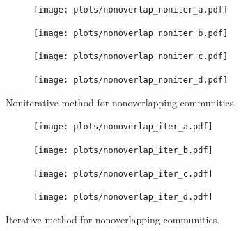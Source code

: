 
\newcommand{\plotwidth}{0.63\linewidth}

\begin{figure}
    \centering
    \begin{subfigure}{0.5\textwidth}
    \centering
    \texttt{[image: plots/nonoverlap\_noniter\_a.pdf]}
    \end{subfigure}%
    \begin{subfigure}{0.5\textwidth}
    \centering
    \texttt{[image: plots/nonoverlap\_noniter\_b.pdf]}
    \end{subfigure}
    \begin{subfigure}{0.5\textwidth}
    \centering
    \texttt{[image: plots/nonoverlap\_noniter\_c.pdf]}
    \end{subfigure}%
    \begin{subfigure}{0.5\textwidth}
    \centering
    \texttt{[image: plots/nonoverlap\_noniter\_d.pdf]}
    \end{subfigure}
    \caption{Noniterative method for nonoverlapping communities.}\label{fig:no_iter_no_overlap}
\end{figure}

\begin{figure}
    \centering
    \begin{subfigure}{0.5\textwidth}
    \centering
    \texttt{[image: plots/nonoverlap\_iter\_a.pdf]}
    \end{subfigure}%
    \begin{subfigure}{0.5\textwidth}
    \centering
    \texttt{[image: plots/nonoverlap\_iter\_b.pdf]}
    \end{subfigure}
    \begin{subfigure}{0.5\textwidth}
    \centering
    \texttt{[image: plots/nonoverlap\_iter\_c.pdf]}
    \end{subfigure}%
    \begin{subfigure}{0.5\textwidth}
    \centering
    \texttt{[image: plots/nonoverlap\_iter\_d.pdf]}
    \end{subfigure}
    \caption{Iterative method for nonoverlapping communities.}\label{fig:iter_no_overlap}
\end{figure}

